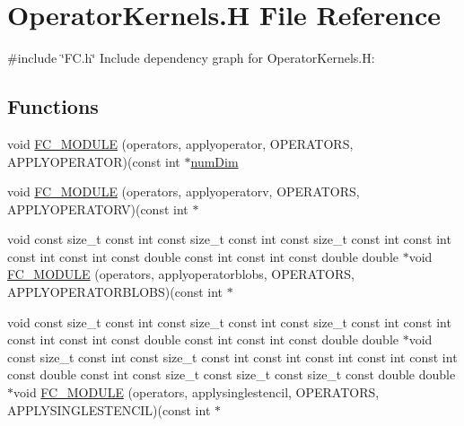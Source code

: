 \hypertarget{OperatorKernels_8H}{}\section{Operator\+Kernels.\+H File Reference}
\label{OperatorKernels_8H}
{\ttfamily \#include \char`\"{}F\+C.\+h\char`\"{}}\newline
Include dependency graph for Operator\+Kernels.\+H\+:
\subsection*{Functions}
\begin{DoxyCompactItemize}
\item 
void \hyperlink{OperatorKernels_8H_a26a2af44853f977c0fec7741c8f7b8dc}{F\+C\+\_\+\+M\+O\+D\+U\+LE} (operators, applyoperator, O\+P\+E\+R\+A\+T\+O\+RS, A\+P\+P\+L\+Y\+O\+P\+E\+R\+A\+T\+OR)(const int $\ast$\hyperlink{SATKernels_8H_a680185db8546de161968dabace9e94f1}{num\+Dim}
\item 
void \hyperlink{OperatorKernels_8H_a6f445acada583d684481b35d1a560255}{F\+C\+\_\+\+M\+O\+D\+U\+LE} (operators, applyoperatorv, O\+P\+E\+R\+A\+T\+O\+RS, A\+P\+P\+L\+Y\+O\+P\+E\+R\+A\+T\+O\+RV)(const int $\ast$
\item 
void const size\+\_\+t const int const size\+\_\+t const int const size\+\_\+t const int const int const int const int const double const int const int const double double $\ast$void \hyperlink{OperatorKernels_8H_a67543feeb7d805fb38829e67abe1ae91}{F\+C\+\_\+\+M\+O\+D\+U\+LE} (operators, applyoperatorblobs, O\+P\+E\+R\+A\+T\+O\+RS, A\+P\+P\+L\+Y\+O\+P\+E\+R\+A\+T\+O\+R\+B\+L\+O\+BS)(const int $\ast$
\item 
void const size\+\_\+t const int const size\+\_\+t const int const size\+\_\+t const int const int const int const int const double const int const int const double double $\ast$void const size\+\_\+t const int const size\+\_\+t const int const int const int const int const int const double const int const size\+\_\+t const size\+\_\+t const size\+\_\+t const double double $\ast$void \hyperlink{OperatorKernels_8H_ab9e653623e29ac7992a41a4fa2b0847b}{F\+C\+\_\+\+M\+O\+D\+U\+LE} (operators, applysinglestencil, O\+P\+E\+R\+A\+T\+O\+RS, A\+P\+P\+L\+Y\+S\+I\+N\+G\+L\+E\+S\+T\+E\+N\+C\+IL)(const int $\ast$
\end{DoxyCompactItemize}
